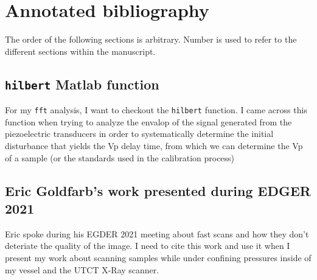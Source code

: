 \documentclass[12pt,titlepage]{article}
\begin{document}
\pagebreak
\section{Annotated bibliography}
The order of the following sections is arbitrary. Number is used to refer to the different sections within the manuscript.

\subsection{\texttt{hilbert} Matlab function}
For my \texttt{fft} analysis, I want to checkout the \texttt{hilbert} function. I came across this function when trying to analyze the envalop of the signal generated from the piezoelectric transducers in order to systematically determine the initial disturbance that yields the Vp delay time, from which we can determine the Vp of a sample (or the standards used in the calibration process)

\subsection{Eric Goldfarb's work presented during EDGER 2021}
Eric spoke during his EGDER	2021 meeting about fast scans and how they don't deteriate the quality of the image. I need to cite this work and use it when I present my work about scanning samples while under confining pressures inside of my vessel and the UTCT X-Ray scanner.
\end{document}
